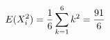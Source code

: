 \documentclass[preview]{standalone}
\begin{document}
\begin{align*}
\special{dvisvgm:raw <g id='unique000'>}E(X_i^2)=\frac16\sum_{k=1}^6k^2=\frac{91}{6}\special{dvisvgm:raw </g>}
\end{align*}
\end{document}
